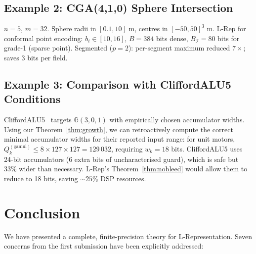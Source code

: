 \documentclass[11pt,a4paper]{article}
\theoremstyle{definition}
\theoremstyle{plain}
\theoremstyle{remark}
\newcommand{\GA}{\mathbb{G}}
\begin{document}
\subsection{Example 2: CGA(4,1,0) Sphere Intersection}

$n=5$, $m=32$.
Sphere radii in $[0.1, 10]$ m, centres in $[-50,50]^3$ m.
L-Rep for conformal point encoding: $b_i \in [10,16]$, $B = 384$ bits dense,
$B_{\mathcal{I}} = 80$ bits for grade-1 (sparse point).
Segmented ($p=2$): per-segment maximum reduced $7\times$; saves 3 bits per field.

\subsection{Example 3: Comparison with CliffordALU5 Conditions}

CliffordALU5~\cite{cliffordalu5} targets $\GA(3,0,1)$ with empirically
chosen accumulator widths.
Using our Theorem~\ref{thm:growth}, we can retroactively compute the
correct minimal accumulator widths for their reported input range:
for unit motors, $Q_k^{(\mathrm{gamul})} \le 8 \times 127 \times 127 = 129\,032$,
requiring $w_k = 18$ bits.
CliffordALU5 uses 24-bit accumulators (6 extra bits of uncharacterised guard),
which is safe but 33\% wider than necessary.
L-Rep's Theorem~\ref{thm:nobleed} would allow them to reduce to 18 bits,
saving $\sim 25\%$ DSP resources.

\section{Conclusion}
\label{sec:conclusion}

We have presented a complete, finite-precision theory for
L-Representation.
Seven concerns from the first submission have been
explicitly addressed:
\end{document}
